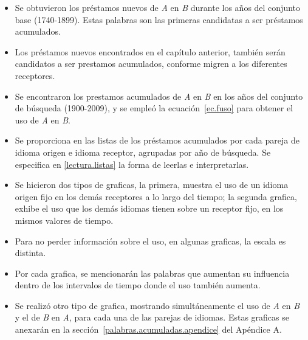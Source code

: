 \begin{itemize}
	
	\item Se obtuvieron los préstamos nuevos de \textit{A} en \textit{B} durante los años del conjunto base (1740-1899). Estas palabras son las primeras candidatas a ser préstamos acumulados.
	
	\item Los préstamos nuevos encontrados en el capítulo anterior, también serán candidatos a ser prestamos acumulados, conforme migren a los diferentes receptores.
	
	\item Se encontraron los prestamos acumulados de \textit{A} en \textit{B} en los años del conjunto de búsqueda (1900-2009), y  se empleó la ecuación~\ref{ec.fuso} para obtener el uso de \textit{A} en \textit{B}.
	
	\item Se proporciona en \cite{prestamos_acumulados} las listas de los préstamos acumulados por cada pareja de idioma origen e idioma receptor, agrupadas por año de búsqueda. Se especifica en \ref{lectura.listas} la forma de leerlas e interpretarlas. 
	
	\item Se hicieron dos tipos de graficas, la primera, muestra el uso de un idioma origen fijo en los demás receptores a lo largo del tiempo; la segunda grafica, exhibe el uso que los demás idiomas tienen sobre un receptor fijo, en los mismos valores de tiempo. 
	
	\item Para  no perder información sobre el uso, en algunas graficas, la escala es distinta.
	
	\item Por cada grafica, se mencionarán las palabras que aumentan su influencia  dentro de los intervalos de tiempo donde el uso también aumenta. 
	
	\item Se realizó otro tipo de grafica, mostrando simultáneamente el uso de \textit{A} en \textit{B} y el de \textit{B} en \textit{A}, para cada una de las parejas de idiomas. Estas graficas se anexarán en la sección~\ref{palabras.acumuladas.apendice} del Apéndice A.
	
	
\end{itemize}

